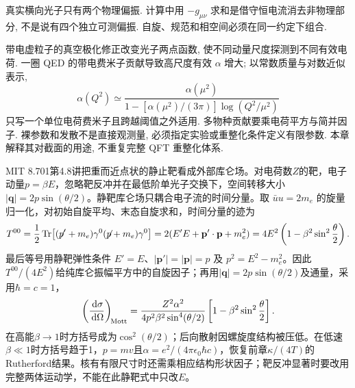 真实横向光子只有两个物理偏振. 计算中用 $-g_{\mu\nu}$ 求和是借守恒电流消去非物理部分, 不是说有四个独立可测偏振. 自旋、规范和相空间必须在同一约定下组合.

带电虚粒子的真空极化修正改变光子两点函数, 使不同动量尺度探测到不同有效电荷. 一圈 QED 的带电费米子贡献导致高尺度有效 $\alpha$ 增大; 以常数质量与对数近似表示,
\begin{equation}
 \alpha(Q^2)\simeq\frac{\alpha(\mu^2)}{1-[\alpha(\mu^2)/(3\pi)]\log(Q^2/\mu^2)}
\end{equation}
只写一个单位电荷费米子且跨越阈值之外适用. 多物种贡献要乘电荷平方与简并因子. 裸参数和发散不是直接观测量, 必须指定实验或重整化条件定义有限参数. 本章解释其对截面的用途, 不重复完整 QFT 重整化体系.

MIT 8.701第4.8讲把重而近点状的静止靶看成外部库仑场。对电荷数$Z$的靶，电子动量$p=\beta E$，忽略靶反冲并在最低阶单光子交换下，空间转移大小$|\mathbf q|=2p\sin(\theta/2)$。静靶库仑场只耦合电子流的时间分量。取 $\bar u u=2m_e$ 的旋量归一化，对初始自旋平均、末态自旋求和，时间分量的迹为
\begin{equation}
T^{00}=\frac12\operatorname{Tr}\!\left[(\mathord{\not\mathrel{p}}'+m_e)\gamma^0
(\mathord{\not\mathrel{p}}+m_e)\gamma^0\right]
=2(E'E+\mathbf p'\cdot\mathbf p+m_e^2)
=4E^2\left(1-\beta^2\sin^2\frac\theta2\right).
\end{equation}
最后等号用静靶弹性条件 $E'=E$、$|\mathbf p'|=|\mathbf p|=p$ 及 $p^2=E^2-m_e^2$。因此$T^{00}/(4E^2)$给纯库仑振幅平方中的自旋因子；再用$|\mathbf q|=2p\sin(\theta/2)$及通量，采用$\hbar=c=1$，
\begin{equation}
\left(\frac{\,\mathrm d\sigma}{\,\mathrm d\Omega}\right)_{\!{\rm Mott}}
=\frac{Z^2\alpha^2}{4p^2\beta^2\sin^4(\theta/2)}
\left[1-\beta^2\sin^2\frac\theta2\right].
\end{equation}
在高能$\beta\to1$时方括号成为$\cos^2(\theta/2)$；后向散射因螺旋度结构被压低。在低速$\beta\ll1$时方括号趋于1，$p=mv$且$\alpha=e^2/(4\pi\epsilon_0\hbar c)$，恢复前章$\kappa/(4T)$的Rutherford结果。核有有限尺寸时还需乘相应结构形状因子；靶反冲显著时要改用完整两体运动学，不能在此静靶式中只改$E$。
